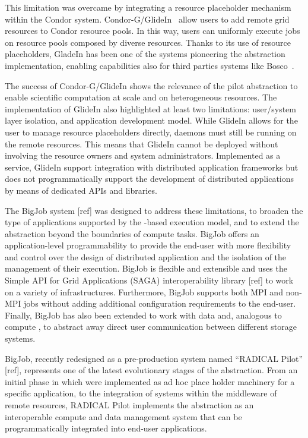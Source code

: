 \documentclass{sig-alternate}
\begin{document}
This limitation was overcame by integrating a resource placeholder mechanism
within the Condor system. Condor-G/GlideIn~\cite{condor-g} allow users to add
remote grid resources to Condor resource pools. In this way, users can uniformly
execute jobs on resource pools composed by diverse resources. Thanks to its use
of resource placeholders, GladeIn has been one of the systems pioneering the
\pilot abstraction implementation, enabling \pilot capabilities also for third
parties systems like Bosco~\cite{bosco}.

The success of Condor-G/GlideIn shows the relevance of the pilot abstraction to
enable scientific computation at scale and on heterogeneous resources. The
implementation of GlideIn also highlighted at least two limitations: user/system
layer isolation, and application development model. While GlideIn allows for the
user to manage resource placeholders directly, daemons must still be running on
the remote resources. This means that GlideIn cannot be deployed without
involving the resource owners and system administrators. Implemented as a
service, GlideIn support integration with distributed application frameworks but
does not programmatically support the development of distributed applications by
means of dedicated APIs and libraries.

The BigJob \pilot system [ref] was designed to address these limitations, to
broaden the type of applications supported by the \pilot-based execution model,
and to extend the \pilot abstraction beyond the boundaries of compute tasks.
BigJob offers an application-level programmability to provide the end-user with
more flexibility and control over the design of distributed application and the
isolation of the management of their execution. BigJob is flexible and
extensible and uses the Simple API for Grid Applications (SAGA) interoperability
library [ref] to work on a variety of infrastructures. Furthermore, BigJob
supports both MPI and non-MPI jobs without adding additional configuration
requirements to the end-user. Finally, BigJob has also been extended to work
with data and, analogous to compute \pilots, to abstract away direct user
communication between different storage systems.

BigJob, recently redesigned as a pre-production system named ``RADICAL Pilot''
[ref], represents one of the latest evolutionary stages of the \pilot
abstraction. From an initial phase in which \pilot were implemented as ad hoc
place holder machinery for a specific application, to the integration of \pilot
systems within the middleware of remote resources, RADICAL Pilot implements the
\pilot abstraction as an interoperable compute and data management system that
can be programmatically integrated into end-user applications.
\end{document}
